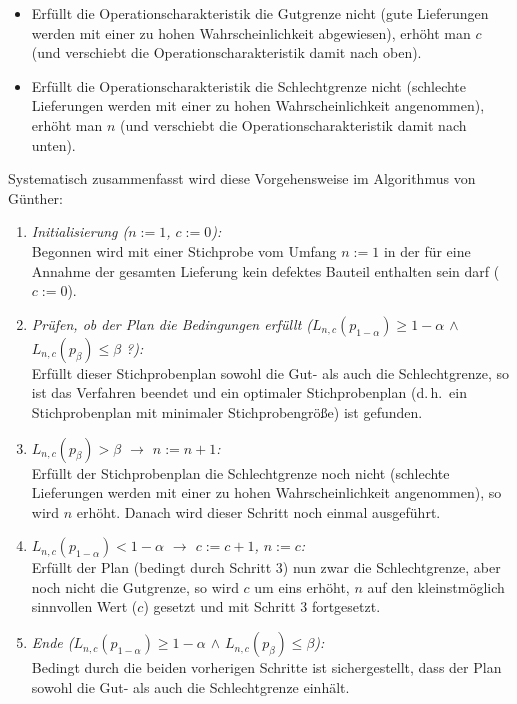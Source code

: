 \documentclass[a4paper,11pt,oneside]{article}
\begin{document}
\begin{itemize}
\item
Erfüllt die Operationscharakteristik die Gutgrenze nicht (gute Lieferungen werden mit einer zu hohen Wahrscheinlichkeit abgewiesen), erhöht man $c$ (und verschiebt die Operationscharakteristik damit nach oben).
\item
Erfüllt die Operationscharakteristik die Schlechtgrenze nicht (schlechte Lieferungen werden mit einer zu hohen Wahrscheinlichkeit angenommen), erhöht man $n$ (und verschiebt die Operationscharakteristik damit nach unten).
\end{itemize}

Systematisch zusammenfasst wird diese Vorgehensweise im Algorithmus von Günther:

\begin{enumerate}
\item
\emph{Initialisierung ($n:=1$, $c:=0$):}~\\
Begonnen wird mit einer Stichprobe vom Umfang $n:=1$ in der für eine Annahme der gesamten Lieferung kein defektes Bauteil enthalten sein darf ($c:=0$).
\item
\emph{Prüfen, ob der Plan die Bedingungen erfüllt ({\color{ForestGreen}$L_{n,c}(p_{1-\alpha})\ge1-\alpha$} $\wedge$ {\color{ForestGreen}$L_{n,c}(p_\beta)\le\beta$} ?):}~\\
Erfüllt dieser Stichprobenplan sowohl die Gut- als auch die Schlechtgrenze, so ist das Verfahren beendet und ein optimaler Stichprobenplan (d.\,h.\ ein Stichprobenplan mit minimaler Stichprobengröße) ist gefunden.
\item
\emph{{\color{Red}$L_{n,c}(p_\beta)>\beta$} $\to$ $n:=n+1$:}~\\
Erfüllt der Stichprobenplan die Schlechtgrenze noch nicht (schlechte Lieferungen werden mit einer zu hohen Wahrscheinlichkeit angenommen), so wird $n$ erhöht. Danach wird dieser Schritt noch einmal ausgeführt.
\item
\emph{{\color{Red}$L_{n,c}(p_{1-\alpha})<1-\alpha$} $\to$ $c:=c+1$, $n:=c$:}~\\
Erfüllt der Plan (bedingt durch Schritt 3) nun zwar die Schlechtgrenze, aber noch nicht die Gutgrenze, so wird $c$ um eins erhöht, $n$ auf den kleinstmöglich sinnvollen Wert ($c$) gesetzt und mit Schritt 3 fortgesetzt.
\item
\emph{Ende ({\color{ForestGreen}$L_{n,c}(p_{1-\alpha})\ge1-\alpha$} $\wedge$ {\color{ForestGreen}$L_{n,c}(p_\beta)\le\beta$}):}~\\
Bedingt durch die beiden vorherigen Schritte ist sichergestellt, dass der Plan sowohl die Gut- als auch die Schlechtgrenze einhält.
\end{enumerate}
\end{document}
